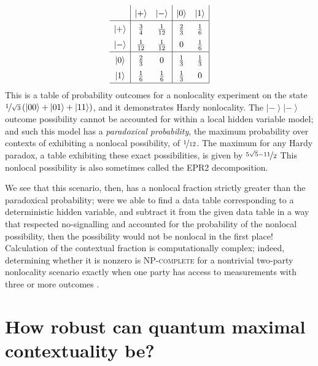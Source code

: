 \documentclass{amsart}
\theoremstyle{definition}
\newcommand{\ket}[1]{{\left\vert{#1}\right\rangle}}
\begin{document}
\begin{equation}\renewcommand{\arraystretch}{1.5}
\begin{array}{c| c c | c c |} \renewcommand{\arraystretch}{1.5}
&\ket{+}&\ket{-}&\ket{0}&\ket{1}\\\hline
\ket{+}&\frac{3}{4} &\frac{1}{12}  &\frac{2}{3} & \frac{1}{6}\\
\ket{-}&\frac{1}{12} &\frac{1}{12}  &0 &\frac{1}{6}\\ \hline
\ket{0}&\frac{2}{3}&0&\frac{1}{3} &\frac{1}{3} \\
\ket{1}&\frac{1}{6}&\frac{1}{6} &\frac{1}{3} &0 \\ \hline
\end{array} \renewcommand{\arraystretch}{1}
\end{equation}
This is a table of probability outcomes for a nonlocality experiment on the state $\nicefrac{1}{\sqrt{3}}\left(\ket{00}+\ket{01}+\ket{11}\right)$, and it demonstrates Hardy nonlocality. The $\ket{-}\ket{-}$ outcome possibility cannot be accounted for within a local hidden variable model; and such this model has a \emph{paradoxical probability}, the maximum probability over contexts of exhibiting a nonlocal possibility, of $\nicefrac{1}{12}$. The maximum for any Hardy paradox, a table exhibiting these exact possibilities, is given by $\nicefrac{5\sqrt{5}-11}{2}$ This nonlocal possibility is also sometimes called the EPR2 decomposition.

We see that this scenario, then, has a nonlocal fraction strictly greater than the paradoxical probability; were we able to find a data table corresponding to a deterministic hidden variable, and subtract it from the given data table in a way that respected no-signalling and accounted for the probability of the nonlocal possibility, then the possibility would not be nonlocal in the first place!
Calculation of the contextual fraction is computationally complex; indeed, determining whether it is nonzero is \textsc{NP-complete} for a 
nontrivial two-party nonlocality scenario exactly when one party has access to measurements with three or more outcomes \cite{SimmCC}.



\section{How robust can quantum maximal contextuality be?}
\end{document}

